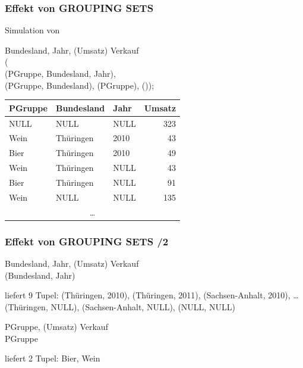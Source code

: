     \begin{frame}
    
      \frametitle{Effekt von GROUPING SETS}
    
      Simulation von 
      \begin{sql}
         Bundesland, Jahr, (Umsatz)  Verkauf \\
        ( \\
        \1 (PGruppe, Bundesland, Jahr), \\
        \1 (PGruppe, Bundesland), (PGruppe), ());
      \end{sql}
    
      {\small
      \begin{center}
        \begin{tabular}{|l|l|l|r|}
          \hline
        \rowcolor{Gray} \textbf{PGruppe} &  \textbf{Bundesland} & \textbf{Jahr} & \textbf{Umsatz} \\
      \hline\hline
      NULL & NULL & NULL & 323 \\
      Wein	& Thüringen	& 2010 &	43 \\
      Bier &	Thüringen	& 2010 &	49 \\
      Wein &	Thüringen & 	NULL &	43 \\
      Bier &	Thüringen	& NULL	 & 91 \\
      Wein		& NULL & NULL &			135 \\
      \multicolumn{4}{|c|}{\dots} \\
      \hline
        \end{tabular}
      \end{center}}
    
    \end{frame}
    
    \begin{frame}
    
      \frametitle{Effekt von GROUPING SETS /2}
    
    \begin{sql}
       Bundesland, Jahr, (Umsatz)  Verkauf \\
      (Bundesland, Jahr)
    \end{sql}
    liefert 9 Tupel: (Thüringen, 2010), (Thüringen, 2011), (Sachsen-Anhalt, 2010), \dots (Thüringen, NULL), (Sachsen-Anhalt, NULL), (NULL, NULL)
    
    \begin{sql}
       PGruppe, (Umsatz)  Verkauf \\
       PGruppe
    \end{sql}
    
    liefert 2 Tupel: Bier, Wein
    \end{frame}
    
